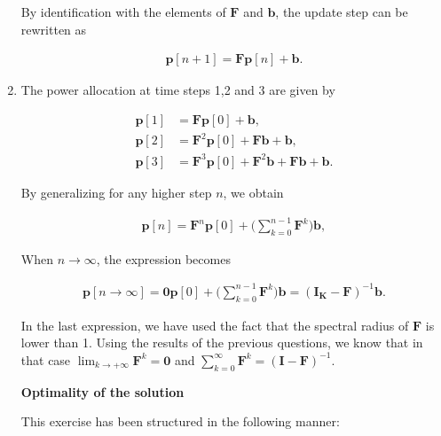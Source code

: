 \documentclass [a4paper, 11pt] {article}
\begin{document}
\begin{solution}
\begin{enumerate}
    By identification with the elements of $\mathbf{F}$ and $\mathbf{b}$, the update step can be rewritten as

    \begin{align}
        \mathbf{p}[n+1] = \mathbf{F} \mathbf{p}[n] + \mathbf{b}.
    \end{align}

    \item The power allocation at time steps 1,2 and 3 are given by

    \begin{align}
    \mathbf{p}[1] &= \mathbf{F} \mathbf{p}[0] + \mathbf{b}, \\
    \mathbf{p}[2] &= \mathbf{F}^2 \mathbf{p}[0] + \mathbf{F} \mathbf{b} + \mathbf{b}, \\
    \mathbf{p}[3] &= \mathbf{F}^3 \mathbf{p}[0] + \mathbf{F}^2 \mathbf{b} + \mathbf{F} \mathbf{b} +\mathbf{b}.
    \end{align}

    By generalizing for any higher step $n$, we obtain

    \begin{align}
    \mathbf{p}[n] = \mathbf{F}^{n} \mathbf{p}[0] + \Bigg(\sum_{k=0}^{n-1} \mathbf{F}^k \Bigg) \mathbf{b},
    \end{align}

    When $n \rightarrow \infty$, the expression becomes

    \begin{align}
    \mathbf{p}[n \rightarrow \infty] = \mathbf{0} \mathbf{p}[0] + \Bigg(\sum_{k=0}^{n-1} \mathbf{F}^k \Bigg) \mathbf{b} = (\mathbf{I_K} - \mathbf{F})^{-1}\mathbf{b}.
    \end{align}

    In the last expression, we have used the fact that the spectral radius of $\mathbf{F}$ is lower than 1. Using the results of the previous questions, we know that in that case $\lim_{k\rightarrow + \infty} \mathbf{F}^k = \mathbf{0}$ and $\sum_{k=0}^{\infty} \mathbf{F}^k = (\mathbf{I} - \mathbf{F})^{-1}$.



    \textbf{Optimality of the solution}

    This exercise has been structured in the following manner:


\end{enumerate}
\end{solution}
\end{document}

